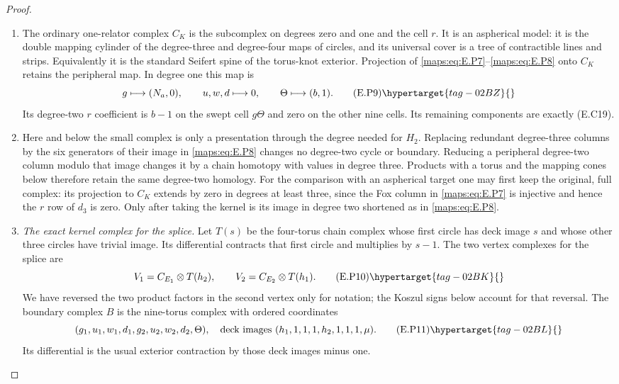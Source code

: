\begin{proof}
\begin{enumerate}[label={$\langle1\rangle$\arabic*.},leftmargin=*]
\item The ordinary one-relator complex $C_K$ is the subcomplex
on degrees zero and one and the cell $r$. It is an
aspherical model: it is the double mapping cylinder
of the degree-three and degree-four maps of circles,
and its universal cover is a tree of contractible
lines and strips. Equivalently it is the standard
Seifert spine of the torus-knot exterior. Projection
of \eqref{maps:eq:E.P7}--\eqref{maps:eq:E.P8} onto $C_K$ retains the peripheral map. In degree one this map is
\[
 g\longmapsto(N_a,0),\qquad
 u,w,d\longmapsto0,\qquad
 \Theta\longmapsto(b,1).
 \tag{E.P9}\hypertarget{tag-02BZ}{}\label{maps:eq:E.P9}
\]
Its degree-two $r$ coefficient is $b-1$ on the swept
cell $g\Theta$ and zero on the other nine cells.
Its remaining components are exactly (E.C19).
\item Here and below the small complex is only a
presentation through the degree needed for $H_2$.
Replacing redundant degree-three columns by the six
generators of their image in \eqref{maps:eq:E.P8} changes no
degree-two cycle or boundary. Reducing a peripheral
degree-two column modulo that image changes it by
a chain homotopy with values in degree three.
Products with a torus and the mapping cones below
therefore retain the same degree-two homology.
For the comparison with an aspherical target one
may first keep the original, full complex: its
projection to $C_K$ extends by zero in degrees at
least three, since the Fox column in \eqref{maps:eq:E.P7} is
injective and hence the $r$ row of $d_3$ is zero.
Only after taking the kernel is its image in degree
two shortened as in \eqref{maps:eq:E.P8}. 

\item \emph{The exact kernel complex for the splice.}
Let $T(s)$ be the four-torus chain complex whose
first circle has deck image $s$ and whose other
three circles have trivial image. Its differential
contracts that first circle and multiplies by $s-1$.
The two vertex complexes for the splice are
\[
 V_1=C_{E_1}\otimes T(h_2),\qquad
 V_2=C_{E_2}\otimes T(h_1).
 \tag{E.P10}\hypertarget{tag-02BK}{}\label{maps:eq:E.P10}
\]
We have reversed the two product factors in the
second vertex only for notation; the Koszul signs
below account for that reversal. The boundary
complex $B$ is the nine-torus complex with ordered
coordinates
\[
 (g_1,u_1,w_1,d_1,g_2,u_2,w_2,d_2,\Theta),
 \quad\text{deck images }(h_1,1,1,1,h_2,1,1,1,\mu).
 \tag{E.P11}\hypertarget{tag-02BL}{}\label{maps:eq:E.P11}
\]
Its differential is the usual exterior contraction
by those deck images minus one.


\end{enumerate}
\end{proof}
